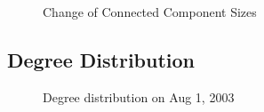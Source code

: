 \documentclass[10pt,twocolumn]{article}
\begin{document}
\begin{figure}[ht]
\caption{Change of Connected Component Sizes \label{fig:cc}}
\end{figure}

\subsection{Degree Distribution}

\begin{figure}[ht]
\caption{Degree distribution on Aug 1, 2003}
\label{fig:deg_dist}
\end{figure}
\end{document}
